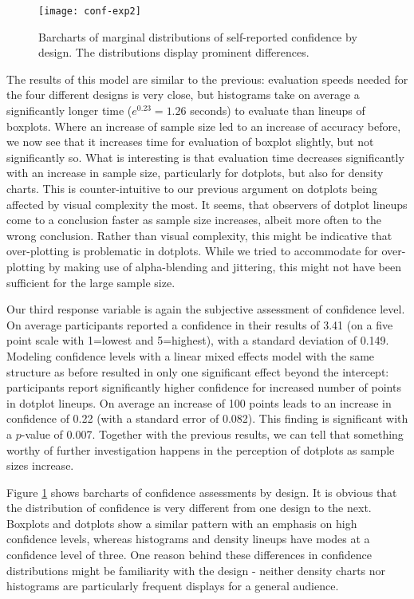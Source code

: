 \begin{figure}[htbp] %
   \centering
   \texttt{[image: conf-exp2]} 
\vspace{-0.25in}
   \caption{Barcharts of marginal distributions of self-reported confidence by design. The distributions display prominent differences.}
   \label{fig:conf-margins}
\end{figure}

The results of this model are similar to the previous: evaluation speeds needed for the four different designs is very close, but  histograms take on average a significantly longer time ($e^{0.23} = 1.26$ seconds) to evaluate than lineups of boxplots. 
Where an increase of sample size led to an increase of accuracy before, we now see that it increases time for evaluation of boxplot slightly, but not significantly so. What is interesting is that evaluation time decreases significantly with an increase in sample size, particularly for dotplots, but also for density charts. This is counter-intuitive to our previous argument on dotplots being affected by visual complexity the most. It seems, that observers of dotplot lineups come to a conclusion faster as sample size increases, albeit more often to  the wrong conclusion. Rather than visual complexity, this might be indicative that over-plotting is problematic in dotplots. While we tried to accommodate for over-plotting by making use of alpha-blending and jittering, this might not have been sufficient for the large sample size.
 

Our third response variable is again the subjective assessment of confidence level. On average participants reported a confidence in their results of  3.41 (on a five point scale with 1=lowest and 5=highest), with a standard deviation of 0.149. Modeling confidence levels with a linear mixed effects model with the same structure as before resulted in only one significant effect beyond the intercept: participants report significantly higher confidence for increased number of  points in dotplot lineups. On average an increase of 100 points leads to an increase in confidence of 0.22 (with a standard error of 0.082). This finding is significant with a $p$-value of 0.007. 
Together with the previous results, we can tell that something worthy of further investigation happens in the perception of dotplots as sample sizes increase. 



Figure \ref{fig:conf-margins} shows barcharts of confidence assessments by design. It is obvious that the distribution of confidence is very different from one design to the next. Boxplots and dotplots show a similar pattern with an emphasis on high confidence levels, whereas histograms and density lineups have modes at a confidence level of three. 
One reason behind these differences in confidence distributions might be familiarity with the design - neither density charts nor histograms are particularly frequent displays for a general audience. 




